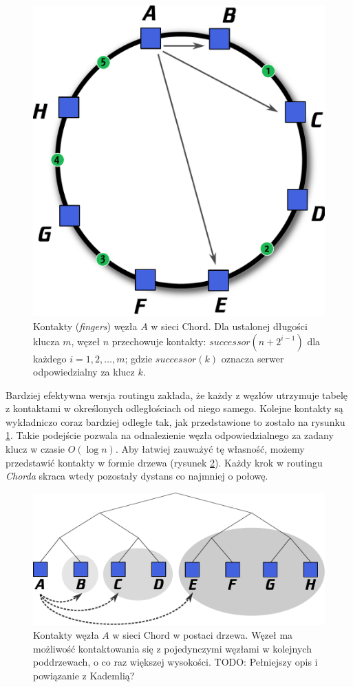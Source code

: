 \documentclass[a4paper,11pt]{scrartcl}
\begin{document}
\begin{figure}[h]
\centering
\includegraphics[width=0.5\linewidth]{img/chord.pdf}
\caption{Kontakty (\textit{fingers}) węzła $A$ w sieci Chord. Dla ustalonej długości klucza $m$, węzeł $n$ przechowuje kontakty: $successor(n + 2^{i-1})$ dla każdego $i = 1, 2, \dots,  m$; gdzie $successor(k)$ oznacza serwer odpowiedzialny za klucz $k$.}
\label{fig_chord_fingers_1}
\end{figure}

Bardziej efektywna wersja routingu zakłada, że każdy z węzłów utrzymuje tabelę z kontaktami w określonych odległościach od niego samego. Kolejne kontakty są wykładniczo coraz bardziej odległe tak, jak przedstawione to zostało na rysunku \ref{fig_chord_fingers_1}. Takie podejście pozwala na odnalezienie węzła odpowiedzialnego za zadany klucz w czasie $O (\log n)$. Aby łatwiej zauważyć tę własność, możemy przedstawić kontakty w formie drzewa (rysunek \ref{fig_chord_fingers_2}). Każdy krok w routingu \textit{Chorda} skraca wtedy pozostały dystans co najmniej o połowę.


\begin{figure}[h]
\centering
\includegraphics[width=0.9\linewidth]{img/chord_2.pdf}
\caption{Kontakty węzła $A$ w sieci Chord w postaci drzewa. Węzeł ma możliwość kontaktowania się z pojedynczymi węzłami w kolejnych poddrzewach, o co raz większej wysokości.  
TODO: Pełniejszy opis i powiązanie z Kademlią?}
\label{fig_chord_fingers_2}
\end{figure}
\end{document}

